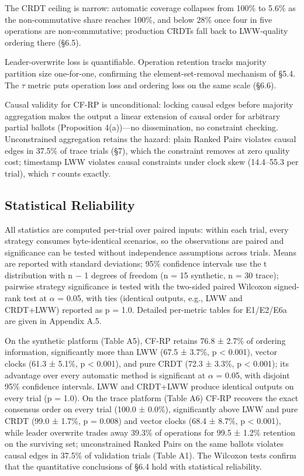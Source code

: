 \documentclass[10pt,twocolumn]{article}
\begin{document}
The CRDT ceiling is narrow: automatic coverage collapses from 100\% to 5.6\% as the non-commutative share reaches 100\%, and below 28\% once four in five operations are non-commutative; production CRDTs fall back to LWW-quality ordering there (§6.5).

Leader-overwrite loss is quantifiable. Operation retention tracks majority partition size one-for-one, confirming the element-set-removal mechanism of §5.4. The $\tau$ metric puts operation loss and ordering loss on the same scale (§6.6).

Causal validity for CF-RP is unconditional: locking causal edges before majority aggregation makes the output a linear extension of causal order for arbitrary partial ballots (Proposition 4(a))—no dissemination, no constraint checking. Unconstrained aggregation retains the hazard: plain Ranked Pairs violates causal edges in 37.5\% of trace trials (§7), which the constraint removes at zero quality cost; timestamp LWW violates causal constraints under clock skew (14.4–55.3 per trial), which $\tau$ counts exactly.

\subsection{Statistical Reliability}
All statistics are computed per-trial over paired inputs: within each trial, every strategy consumes byte-identical scenarios, so the observations are paired and significance can be tested without independence assumptions across trials. Means are reported with standard deviations; 95\% confidence intervals use the t distribution with n $-$ 1 degrees of freedom (n = 15 synthetic, n = 30 trace); pairwise strategy significance is tested with the two-sided paired Wilcoxon signed-rank test at $\alpha$ = 0.05, with ties (identical outputs, e.g., LWW and CRDT+LWW) reported as p = 1.0. Detailed per-metric tables for E1/E2/E6a are given in Appendix A.5.

On the synthetic platform (Table A5), CF-RP retains 76.8 ± 2.7\% of ordering information, significantly more than LWW (67.5 ± 3.7\%, p < 0.001), vector clocks (61.3 ± 5.1\%, p < 0.001), and pure CRDT (72.3 ± 3.3\%, p < 0.001); its advantage over every automatic method is significant at $\alpha$ = 0.05, with disjoint 95\% confidence intervals. LWW and CRDT+LWW produce identical outputs on every trial (p = 1.0). On the trace platform (Table A6) CF-RP recovers the exact consensus order on every trial (100.0 ± 0.0\%), significantly above LWW and pure CRDT (99.0 ± 1.7\%, p = 0.008) and vector clocks (68.4 ± 8.7\%, p < 0.001), while leader overwrite trades away 39.3\% of operations for 99.5 ± 1.2\% retention on the surviving set; unconstrained Ranked Pairs on the same ballots violates causal edges in 37.5\% of validation trials (Table A1). The Wilcoxon tests confirm that the quantitative conclusions of §6.4 hold with statistical reliability.
\end{document}

